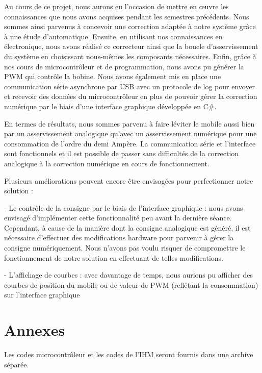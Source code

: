 \documentclass[11pt, french]{article} %
\begin{document}
Au cours de ce projet, nous aurons eu l'occasion de mettre en œuvre les connaissances que nous avons acquises pendant les semestres précédents. Nous sommes ainsi parvenus à concevoir une correction adaptée à notre système grâce à une étude d'automatique. Ensuite, en utilisant nos connaissances en électronique, nous avons réalisé ce correcteur ainsi que la boucle d'asservissement du système en choisissant nous-mêmes les composants nécessaires. Enfin, grâce à nos cours de microcontrôleur et de programmation, nous avons pu générer la PWM qui contrôle la bobine. Nous avons également mis en place une communication série asynchrone par USB avec un protocole de log pour envoyer et recevoir des données du microcontrôleur en plus de pouvoir gérer la correction numérique par le biais d'une interface graphique développée en C\#. 

\medskip

En termes de résultats, nous sommes parvenu à faire léviter le mobile aussi bien par un asservissement analogique qu'avec un asservissement numérique pour une consommation de l'ordre du demi Ampère. La communication série et l'interface sont fonctionnels et il est possible de passer sans difficultés de la correction analogique à la correction numérique en cours de fonctionnement. 

\medskip

Plusieurs améliorations peuvent encore être envisagées pour perfectionner notre solution :

- Le contrôle de la consigne par le biais de l'interface graphique : nous avons envisagé d'implémenter cette fonctionnalité peu avant la dernière séance. Cependant, à cause de la manière dont la consigne analogique est généré, il est nécessaire d'effectuer des modifications hardware pour parvenir à gérer la consigne numériquement. Nous n'avons pas voulu risquer de compromettre le fonctionnement de notre solution en effectuant de telles modifications.

- L'affichage de courbes : avec davantage de temps, nous aurions pu afficher des courbes de position du mobile ou de valeur de PWM (reflétant la consommation) sur l'interface graphique

\pagebreak
\section*{Annexes}

Les codes microcontrôleur et les codes de l'IHM seront fournis dans une archive séparée. 
\end{document}
